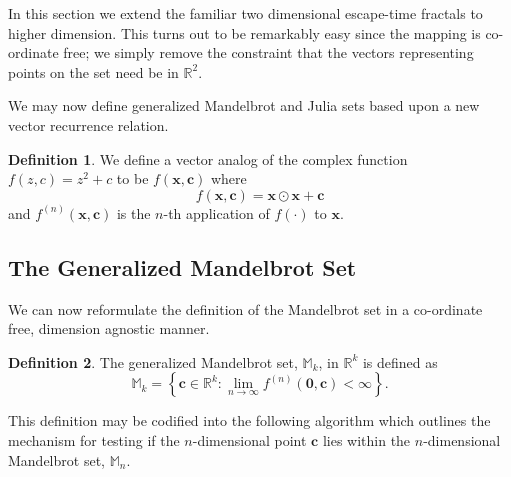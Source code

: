 \documentclass{elsart}
\theoremstyle{definition}
\newtheorem{definition}{Definition}
\newcommand{\complexprod}{\odot}
\begin{document}
In this section we extend the familiar two dimensional escape-time fractals to
higher dimension.  This turns out to be remarkably easy since the mapping is
co-ordinate free; we simply remove the constraint that the vectors representing
points on the set need be in $\mathbb{R}^2$.

We may now define generalized Mandelbrot and Julia sets based upon
a new vector recurrence relation.

\begin{definition}\label{def:gen_f(r)}
We define a vector analog of the complex function $f(z, c) = z^2 + c$ to be 
$f(\mathbf{x}, \mathbf{c})$ where
\begin{equation}
f(\mathbf{x}, \mathbf{c}) = \mathbf{x}\complexprod\mathbf{x} + \mathbf{c}
\end{equation}
and $f^{(n)}(\mathbf{x}, \mathbf{c})$ is the $n$-th application of 
$f(\cdot)$ to $\mathbf{x}$.
\end{definition}

\subsection{The Generalized Mandelbrot Set}

We can now reformulate the definition of the Mandelbrot set in a co-ordinate
free, dimension agnostic manner. 

\begin{definition}%
The generalized Mandelbrot set, $\mathbb{M}_k$, in $\mathbb{R}^k$ 
    is defined as
\begin{equation}
\mathbb{M}_k = 
\left\{\mathbf{c} \in \mathbb{R}^k 
: \lim_{n \rightarrow \infty} f^{(n)}(\mathbf{0}, \mathbf{c}) < \infty \right\}.
\end{equation}
\end{definition}

This definition may be codified into the following algorithm which outlines the mechanism
for testing if the $n$-dimensional point $\mathbf{c}$ lies within the 
$n$-dimensional Mandelbrot set, $\mathbb{M}_n$.
\end{document}
